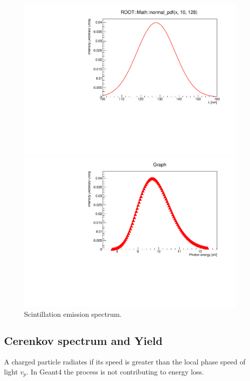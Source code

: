 \documentclass[a4paper]{jpconf}
\begin{document}
\begin{figure}
\centering
\begin{minipage}{.5\textwidth}
  \centering
  \includegraphics[width=.7\linewidth]{spectrum.pdf}
\end{minipage}%
\begin{minipage}{.5\textwidth}
  \centering
  \includegraphics[width=.7\linewidth]{spectrumE.pdf}
\end{minipage}
\caption{\label{fig:spectrum}Scintillation emission spectrum.}
\end{figure}

\subsection{Cerenkov spectrum and Yield}
A charged particle radiates if its speed is greater than the local phase speed of light $v_p$. 
In Geant4 the process is not contributing to energy loss.
\end{document}
